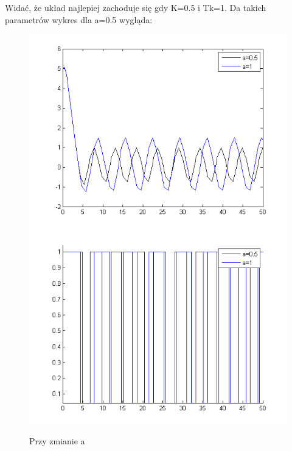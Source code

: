 \documentclass[a4paper,10pt]{article}
\begin{document}
\begin{enumerate}
\newpage
Widać, że układ najlepiej zachoduje się gdy K=0.5 i Tk=1.
Da takich parametrów wykres dla a=0.5 wygląda:
\begin{figure}[!h]
    \centering
	\includegraphics[width=120mm]{CW3-korekcja-dwupolozeniowy-e_a.png}
	\includegraphics[width=120mm]{CW3-korekcja-dwupolozeniowy-u_a.png}
	\caption{Przy zmianie a}
    \label{fig:Rysunek}
\end{figure}


\newpage


\end{enumerate}
\end{document}
